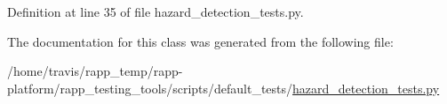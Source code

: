 Definition at line 35 of file hazard\-\_\-detection\-\_\-tests.\-py.



The documentation for this class was generated from the following file\-:\begin{DoxyCompactItemize}
\item 
/home/travis/rapp\-\_\-temp/rapp-\/platform/rapp\-\_\-testing\-\_\-tools/scripts/default\-\_\-tests/\hyperlink{hazard__detection__tests_8py}{hazard\-\_\-detection\-\_\-tests.\-py}\end{DoxyCompactItemize}
